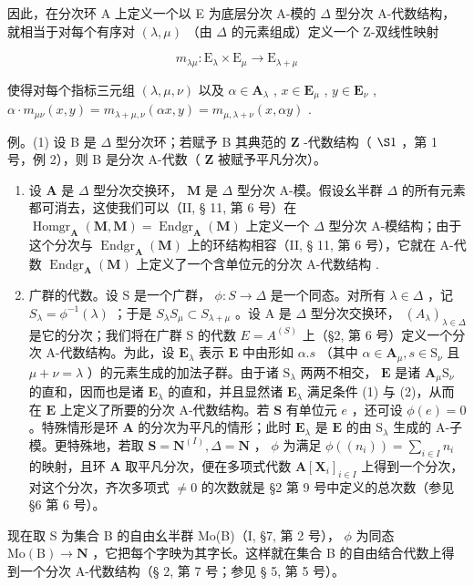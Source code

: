 因此，在分次环 A 上定义一个以 E 为底层分次 A-模的 \(\Delta\) 型分次 A-代数结构，就相当于对每个有序对 \((\lambda, \mu)\) （由 \(\Delta\) 的元素组成）定义一个 Z-双线性映射

\[
m _ {\lambda \mu}: \mathrm{E} _ {\lambda} \times \mathrm{E} _ {\mu} \rightarrow \mathrm{E} _ {\lambda + \mu}
\]

使得对每个指标三元组 \((\lambda, \mu, \nu)\) 以及 \(\alpha \in \mathbf{A}_{\lambda}\) , \(x \in \mathbf{E}_{\mu}\) , \(y \in \mathbf{E}_{\nu}\) , \(\alpha \cdot m_{\mu\nu}(x, y) = m_{\lambda + \mu, \nu}(\alpha x, y) = m_{\mu, \lambda + \nu}(x, \alpha y)\) .

例。(1) 设 B 是 \(\Delta\) 型分次环；若赋予 B 其典范的 \(\mathbf{Z}\) -代数结构（ \(\S 1\) ，第 1 号，例 2），则 B 是分次 A-代数（ \(\mathbf{Z}\) 被赋予平凡分次）。

\begin{enumerate}
\def\labelenumi{(\arabic{enumi})}
\setcounter{enumi}{1}
\item
  设 \(\mathbf{A}\) 是 \(\Delta\) 型分次交换环， \(\mathbf{M}\) 是 \(\Delta\) 型分次 A-模。假设幺半群 \(\Delta\) 的所有元素都可消去，这使我们可以（II, § 11, 第 6 号）在 \(\operatorname{Homgr}_{\mathbf{A}}(\mathbf{M}, \mathbf{M}) = \operatorname{Endgr}_{\mathbf{A}}(\mathbf{M})\) 上定义一个 \(\Delta\) 型分次 A-模结构；由于这个分次与 \(\operatorname{Endgr}_{\mathbf{A}}(\mathbf{M})\) 上的环结构相容（II, § 11, 第 6 号），它就在 A-代数 \(\operatorname{Endgr}_{\mathbf{A}}(\mathbf{M})\) 上定义了一个含单位元的分次 A-代数结构 .
\item
  广群的代数。设 S 是一个广群， \(\phi: S \to \Delta\) 是一个同态。对所有 \(\lambda \in \Delta\) ，记 \(S_{\lambda} = \phi^{-1}(\lambda)\) ；于是 \(S_{\lambda}S_{\mu} \subset S_{\lambda + \mu}\) 。设 A 是 \(\Delta\) 型分次交换环， \((A_{\lambda})_{\lambda \in \Delta}\) 是它的分次；我们将在广群 S 的代数 \(E = A^{(S)}\) 上（§2, 第 6 号）定义一个分次 A-代数结构。为此，设 \(\mathbf{E}_{\lambda}\) 表示 \(\mathbf{E}\) 中由形如 \(\alpha .s\) （其中 \(\alpha \in \mathbf{A}_{\mu}, s \in \mathrm{S}_{\nu}\) 且 \(\mu + \nu = \lambda\) ）的元素生成的加法子群。由于诸 \(\mathrm{S}_{\lambda}\) 两两不相交， \(\mathbf{E}\) 是诸 \(\mathbf{A}_{\mu}\mathrm{S}_{\nu}\) 的直和，因而也是诸 \(\mathbf{E}_{\lambda}\) 的直和，并且显然诸 \(\mathbf{E}_{\lambda}\) 满足条件 (1) 与 (2)，从而在 \(\mathbf{E}\) 上定义了所要的分次 A-代数结构。若 \(\mathbf{S}\) 有单位元 \(e\) ，还可设 \(\phi(e) = 0\) 。特殊情形是环 \(\mathbf{A}\) 的分次为平凡的情形；此时 \(\mathbf{E}_{\lambda}\) 是 \(\mathbf{E}\) 的由 \(\mathrm{S}_{\lambda}\) 生成的 A-子模。更特殊地，若取 \(\mathbf{S} = \mathbf{N}^{(I)}, \Delta = \mathbf{N}\) ， \(\phi\) 为满足 \(\phi((n_{i})) = \sum_{i \in I} n_{i}\) 的映射，且环 \(\mathbf{A}\) 取平凡分次，便在多项式代数 \(\mathbf{A}[\mathbf{X}_{i}]_{i \in I}\) 上得到一个分次，对这个分次，齐次多项式 \(\neq 0\) 的次数就是 §2 第 9 号中定义的总次数（参见 §6 第 6 号）。
\end{enumerate}

现在取 S 为集合 B 的自由幺半群 Mo(B)（I, §7, 第 2 号）， \(\phi\) 为同态 \(\mathrm{Mo(B)} \to \mathbf{N}\) ，它把每个字映为其字长。这样就在集合 B 的自由结合代数上得到一个分次 A-代数结构（§ 2, 第 7 号；参见 § 5, 第 5 号）。

